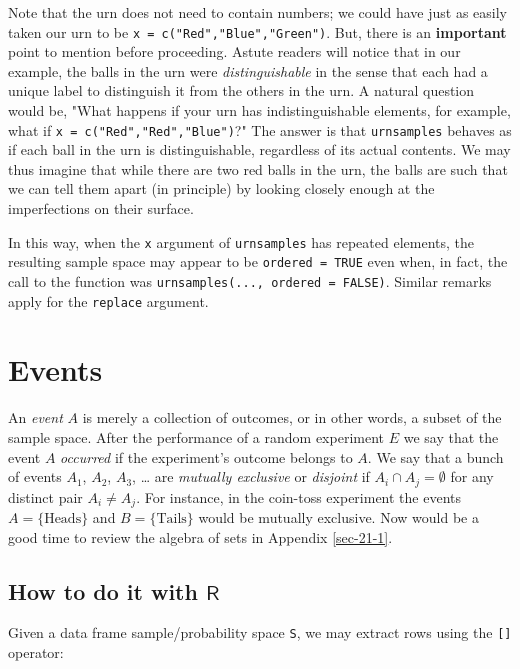 Note that the urn does not need to contain numbers; we could have just
as easily taken our urn to be \texttt{x = c("Red","Blue","Green")}. But,
there is an \textbf{important} point to mention before proceeding. Astute
readers will notice that in our example, the balls in the urn were
\emph{distinguishable} in the sense that each had a unique label to
distinguish it from the others in the urn. A natural question would
be, "What happens if your urn has indistinguishable elements, for
example, what if \texttt{x = c("Red","Red","Blue")}?" The answer is that
\texttt{urnsamples} behaves as if each ball in the urn is distinguishable,
regardless of its actual contents. We may thus imagine that while
there are two red balls in the urn, the balls are such that we can
tell them apart (in principle) by looking closely enough at the
imperfections on their surface.

In this way, when the \texttt{x} argument of \texttt{urnsamples} has repeated
elements, the resulting sample space may appear to be \texttt{ordered = TRUE}
even when, in fact, the call to the function was \texttt{urnsamples(...,
ordered = FALSE)}. Similar remarks apply for the \texttt{replace} argument.

\section{Events}
\label{sec-4-2}

An \emph{event}  \(A\) is merely a collection of outcomes, or
in other words, a subset of the sample space. After the
performance of a random experiment \(E\) we say that the event \(A\)
\emph{occurred} if the experiment's outcome belongs to \(A\). We say that a
bunch of events \(A_{1}\), \(A_{2}\), \(A_{3}\), \ldots{} are \emph{mutually
exclusive}  or \emph{disjoint} if \(A_{i}\cap
A_{j}=\emptyset\) for any distinct pair \(A_{i}\neq A_{j}\). For
instance, in the coin-toss experiment the events \( A = \{
\mbox{Heads} \}\) and \( B = \{ \mbox{Tails} \} \) would be mutually
exclusive. Now would be a good time to review the algebra of sets in
Appendix \ref{sec-21-1}.

\subsection{How to do it with \(\mathsf{R}\)}
\label{sec-4-2-1}

Given a data frame sample/probability space \texttt{S}, we may extract rows
using the \texttt{[]} operator:

